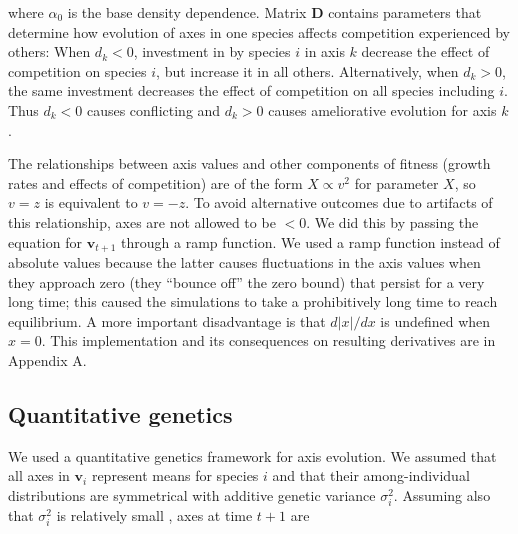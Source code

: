 \noindent where $\alpha_0$ is the base density dependence.
Matrix $\mathbf{D}$ contains parameters that determine how evolution of axes
in one species affects competition experienced by others:
When $d_k < 0$, investment in by species $i$ in axis $k$ decrease the
effect of competition on species $i$, but increase it in all others.
Alternatively, when $d_k > 0$, the same investment decreases the effect of
competition on all species including $i$.
Thus $d_k < 0$ causes conflicting and $d_k > 0$ causes ameliorative evolution
for axis $k$ \citep{Northfield:2013if}.


The relationships between axis values and other components of fitness
(growth rates and effects of competition) are of the form
$X \propto v^2$ for parameter $X$, so $v = z$ is equivalent to $v = -z$.
To avoid alternative outcomes due to artifacts of this relationship,
axes are not allowed to be $< 0$.
We did this by passing the equation for $\mathbf{v}_{t+1}$ through a
ramp function.
We used a ramp function instead of absolute values
because the latter causes fluctuations
in the axis values when they approach zero (they ``bounce off''
the zero bound) that persist for a very long time;
this caused the simulations to take a prohibitively long time to reach
equilibrium.
A more important disadvantage is that $d \lvert x \rvert / dx$ is
undefined when $x = 0$.
This implementation and its consequences on resulting derivatives are in
Appendix A.




%


\subsection*{Quantitative genetics}

We used a quantitative genetics framework for axis evolution.
We assumed that all axes in $\mathbf{v}_i$ represent means for species $i$
and that their among-individual distributions are symmetrical with additive
genetic variance $\sigma^2_i$.
Assuming also that $\sigma^2_i$ is relatively small
\citep{Iwasa:1991eo,Abrams:2001va,Abrams:1993cr}, axes at time $t+1$ are

